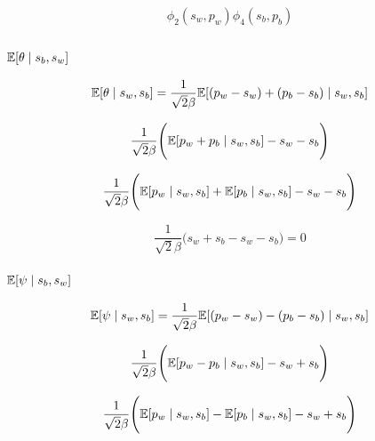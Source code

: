 \documentclass[a4paper,11pt]{article}
\theoremstyle{mytheor}
\newcommand{\E}{\Bbb{E}}
\begin{document}
\begin{equation}
    \label{eq:chain_rule_5}
    \phi_{2}(s_w,p_w)\phi_{4}(s_b,p_b)
\end{equation}

\subsection{}
\subsubsection{$\E[\theta \mid s_b,s_w]$}

\begin{equation}
    \label{e_theta}
    \Bbb{E}[\theta\mid s_w,s_b] = \frac{1}{\sqrt{2}\beta}\Bbb{E}[(p_w-s_w)+(p_b-s_b) \mid s_w,s_b]
\end{equation}

\begin{equation}
    \label{e_theta_2}
    \frac{1}{\sqrt{2}\beta} \Bigg( \Bbb{E}[p_w+p_b \mid s_w,s_b]-s_w-s_b \Bigg)
\end{equation}

\begin{equation}
    \label{e_theta_3}
    \frac{1}{\sqrt{2}\beta} \Bigg( \Bbb{E}[p_w\mid s_w,s_b] + \Bbb{E}[p_b \mid s_w,s_b]-s_w-s_b \Bigg)
\end{equation}


\begin{equation}
    \label{e_theta_4}
    \frac{1}{\sqrt{2}\beta} \Bigg( s_w+s_b-s_w-s_b \Bigg) = 0
\end{equation}

\subsubsection{$\E[\psi \mid s_b,s_w]$}

\begin{equation}
    \label{e_psi}
    \Bbb{E}[\psi\mid s_w,s_b] = \frac{1}{\sqrt{2}\beta}\Bbb{E}[(p_w-s_w)-(p_b-s_b) \mid s_w,s_b]
\end{equation}

\begin{equation}
    \label{e_psi_2}
    \frac{1}{\sqrt{2}\beta} \Bigg( \Bbb{E}[p_w-p_b \mid s_w,s_b]-s_w+s_b \Bigg)
\end{equation}

\begin{equation}
    \label{e_psi_3}
    \frac{1}{\sqrt{2}\beta} \Bigg( \Bbb{E}[p_w\mid s_w,s_b] - \Bbb{E}[p_b \mid s_w,s_b]-s_w+s_b \Bigg)
\end{equation}
\end{document}
